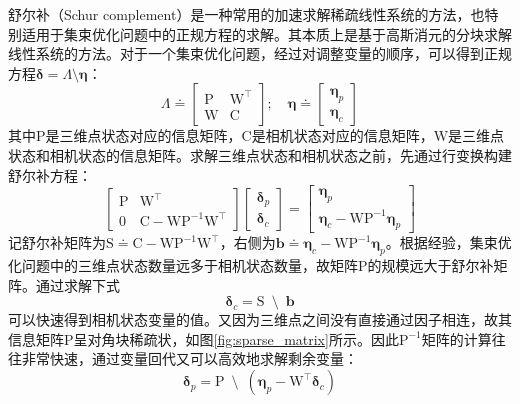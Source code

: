 舒尔补（Schur complement）是一种常用的加速求解稀疏线性系统的方法，也特别适用于集束优化问题中的正规方程的求解。其本质上是基于高斯消元的分块求解线性系统的方法。对于一个集束优化问题，经过对调整变量的顺序，可以得到正规方程$\bm{\delta} =\Lambda\setminus\bm{\eta}$：
\begin{equation}
    \Lambda \doteq
    \begin{bmatrix}
        \mathrm{P} & \mathrm{W}^\top \\
        \mathrm{W} & \mathrm{C}
    \end{bmatrix};
    \quad
    \bm{\eta} \doteq
    \begin{bmatrix} \bm{\eta}_p \\ \bm{\eta}_c \end{bmatrix}
\end{equation}
其中$\mathrm{P}$是三维点状态对应的信息矩阵，$\mathrm{C}$是相机状态对应的信息矩阵，$\mathrm{W}$是三维点状态和相机状态的信息矩阵。求解三维点状态和相机状态之前，先通过行变换构建舒尔补方程：
\begin{equation}
    \begin{bmatrix}
        \mathrm{P} & \mathrm{W}^\top \\
                 0 & \mathrm{C}-\mathrm{W}\mathrm{P}^{-1}\mathrm{W}^\top
    \end{bmatrix}
    \begin{bmatrix} \bm{\delta}_p \\ \bm{\delta}_c \end{bmatrix} =
    \begin{bmatrix}
        \bm{\eta}_p \\
        \bm{\eta}_c-\mathrm{W}\mathrm{P}^{-1}\bm{\eta}_p
    \end{bmatrix}
    \label{eq:schur_complement}
\end{equation}
记舒尔补矩阵为$\mathrm{S}\doteq\mathrm{C}-\mathrm{W}\mathrm{P}^{-1}\mathrm{W}^\top$，右侧为$\bm{b}\doteq{\bm{\eta}_c-\mathrm{W}\mathrm{P}^{-1}\bm{\eta}_p}$。根据经验，集束优化问题中的三维点状态数量远多于相机状态数量，故矩阵$\mathrm{P}$的规模远大于舒尔补矩阵。通过求解下式
\begin{equation}
    \bm{\delta}_c = \mathrm{S} \enspace\setminus\enspace \bm{b}
    \label{eq:solve_schur}
\end{equation}
可以快速得到相机状态变量的值。又因为三维点之间没有直接通过因子相连，故其信息矩阵$\mathrm{P}$呈对角块稀疏状，如图\ref{fig:sparse_matrix}所示。因此$\mathrm{P}^{-1}$矩阵的计算往往非常快速，通过变量回代又可以高效地求解剩余变量：
\begin{equation}
    \bm{\delta}_p = \mathrm{P}
    \enspace\setminus\enspace
    \left( \bm{\eta}_p-\mathrm{W}^\top\bm{\delta}_c \right)
    \label{eq:back_sub}
\end{equation}

